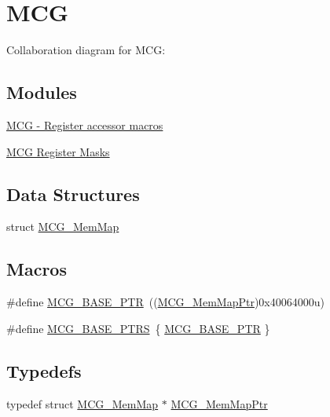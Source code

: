 \hypertarget{group___m_c_g___peripheral}{}\section{M\+CG}
\label{group___m_c_g___peripheral}
Collaboration diagram for M\+CG\+:
\subsection*{Modules}
\begin{DoxyCompactItemize}
\item 
\hyperlink{group___m_c_g___register___accessor___macros}{M\+C\+G -\/ Register accessor macros}
\item 
\hyperlink{group___m_c_g___register___masks}{M\+C\+G Register Masks}
\end{DoxyCompactItemize}
\subsection*{Data Structures}
\begin{DoxyCompactItemize}
\item 
struct \hyperlink{struct_m_c_g___mem_map}{M\+C\+G\+\_\+\+Mem\+Map}
\end{DoxyCompactItemize}
\subsection*{Macros}
\begin{DoxyCompactItemize}
\item 
\#define \hyperlink{group___m_c_g___peripheral_gaceefc72e93a47a35f59a31c57dddf41b}{M\+C\+G\+\_\+\+B\+A\+S\+E\+\_\+\+P\+TR}~((\hyperlink{group___m_c_g___peripheral_ga1cb93dd00863c129e7753ec45a7c3563}{M\+C\+G\+\_\+\+Mem\+Map\+Ptr})0x40064000u)
\item 
\#define \hyperlink{group___m_c_g___peripheral_ga3e6aec328b7327acc1f7bff70bec388c}{M\+C\+G\+\_\+\+B\+A\+S\+E\+\_\+\+P\+T\+RS}~\{ \hyperlink{group___m_c_g___peripheral_gaceefc72e93a47a35f59a31c57dddf41b}{M\+C\+G\+\_\+\+B\+A\+S\+E\+\_\+\+P\+TR} \}
\end{DoxyCompactItemize}
\subsection*{Typedefs}
\begin{DoxyCompactItemize}
\item 
typedef struct \hyperlink{struct_m_c_g___mem_map}{M\+C\+G\+\_\+\+Mem\+Map} $\ast$ \hyperlink{group___m_c_g___peripheral_ga1cb93dd00863c129e7753ec45a7c3563}{M\+C\+G\+\_\+\+Mem\+Map\+Ptr}
\end{DoxyCompactItemize}


